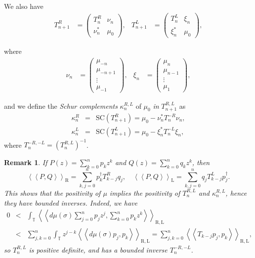 \documentclass[11pt]{article}
\newtheorem{remark}{Remark}[section]
\begin{document}
\noindent We also have 
\begin{align*}
T^{R}_{n+1}&=
\begin{pmatrix}
T^{R}_{n} & \nu_{n}\\
\nu^{*}_{n} & \mu_{0}
\end{pmatrix},
&
T^{L}_{n+1}&=
\begin{pmatrix}
T^{L}_{n} & \xi_{n}\\
\xi^{*}_{n} & \mu_{0}
\end{pmatrix},
\end{align*}

\noindent where  
\begin{align*}
\nu_{n}&=
\begin{pmatrix}
\mu_{-n}\\
\mu_{-n+1}\\
\vdots \\
\mu_{-1}
\end{pmatrix},
&
\xi_{n}&=
\begin{pmatrix}
\mu_{n}\\
\mu_{n-1}\\
\vdots \\
\mu_{1}
\end{pmatrix},
\end{align*}

\noindent and we define the {\it Schur complements} $\kappa_{n}^{R,L}$ of $\mu_{0}$ {\it in} $T^{R,L}_{n+1}$ as
\begin{eqnarray*}
\kappa_{n}^{R} &=& \mathrm{SC}(T^{R}_{n+1}) = \mu_{0} - \nu^{*}_{n} T^{-R}_{n}\nu_{n}, \\
\kappa_{n}^{L} &=& \mathrm{SC}(T^{L}_{n+1}) = \mu_{0} - \xi^{*}_{n} T^{-L}_{n}\xi_{n},
\end{eqnarray*}
\noindent where  $T^{-R,-L}_{n}= (T^{R,L}_{n})^{-1}$.

\begin{remark} 
If $P(z)=\sum_{k=0}^{n}p_k z^k$ and $Q(z)=\sum_{k=0}^{n}q_k z^k$, then $$\left\langle \left\langle P, Q \right\rangle \right\rangle_\mathrm{R}= \sum_{k,j=0}^{n}p_k^{\dag} T_{k-j}^{R}q_j,\quad \left\langle \left\langle P, Q \right\rangle \right\rangle_\mathrm{L}= \sum_{k,j=0}^{n}q_j T_{k-j}^{L}p_j^{\dag}.$$
This shows that the positivity of $\mu$ implies the positivity of $T^{R,L}_{n}$ and $\kappa_{n}^{R,L}$, hence they have bounded inverses. Indeed, we have 
\begin{eqnarray*}
0 &<& \int_{\mathbb{T}}\left\langle \left\langle d\mu(\sigma) \sum_{j=0}^{n}p_j z^j, \sum_{k=0}^{n}p_k z^k \right\rangle \right\rangle_\mathrm{R,L} \\
  &<& \sum_{j,k=0}^{n}\int_{\mathbb{T}}z^{j-k}\left\langle \left\langle d\mu(\sigma) p_j, p_k \right\rangle \right\rangle_\mathrm{R,L}=\sum_{j,k=0}^{n}\left\langle \left\langle T_{k-j} p_j, p_k \right\rangle \right\rangle_\mathrm{R,L},
\end{eqnarray*}
so $T^{R,L}_{n}$ is positive definite, and has a bounded inverse $T^{-R,-L}_{n}$.  
\end{remark} 
\end{document}
